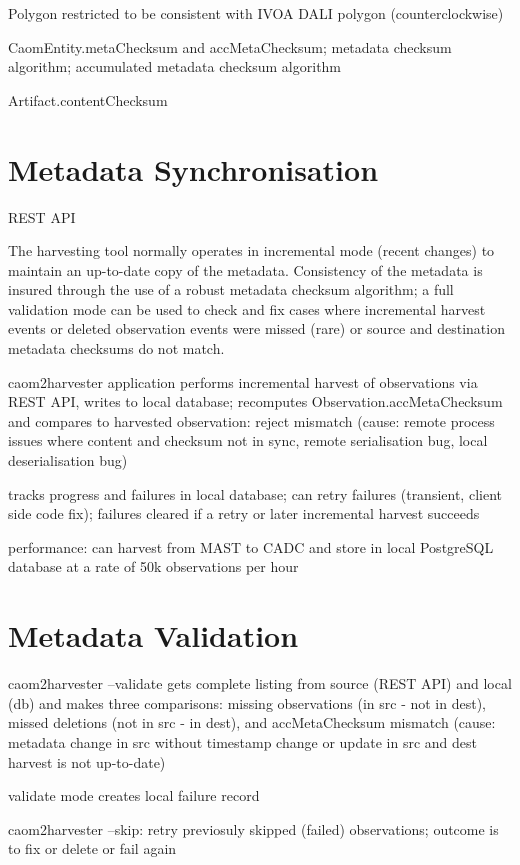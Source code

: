 \documentclass[11pt,twoside]{article}
\begin{document}
Polygon restricted to be consistent with IVOA DALI \citep{std:DALI} polygon (counterclockwise)


CaomEntity.metaChecksum and accMetaChecksum;
metadata checksum algorithm;
accumulated metadata checksum algorithm

Artifact.contentChecksum

\section{Metadata Synchronisation}

REST \citep{REST} API

The harvesting tool normally operates in incremental mode (recent changes) to maintain an up-to-date copy of the metadata. Consistency of the metadata is insured through the use of a robust metadata checksum algorithm; a full validation mode can be used to check and fix cases where incremental harvest events or deleted observation events were missed (rare) or source and destination metadata checksums do not match.

caom2harvester application performs incremental harvest of observations via REST API, writes to local database;
recomputes Observation.accMetaChecksum and compares to harvested observation: reject mismatch (cause: remote process issues where content and checksum not in sync, remote serialisation bug, local deserialisation bug)

tracks progress and failures in local database; 
can retry failures (transient, client side code fix);
failures cleared if a retry or later incremental harvest succeeds

performance: can harvest from MAST to CADC and store in local PostgreSQL database at a rate of 50k observations per hour

\section{Metadata Validation}

caom2harvester --validate gets complete listing from source (REST API) and local (db) and makes three comparisons: 
missing observations (in src - not in dest), missed deletions (not in src - in dest), and accMetaChecksum mismatch 
(cause: metadata change in src without timestamp change or update in src and dest harvest is not up-to-date)

validate mode creates local failure record

caom2harvester --skip: retry previosuly skipped (failed) observations; outcome is to fix or delete or fail again
\end{document}
